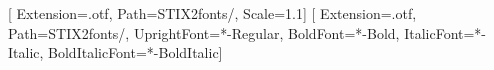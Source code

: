 \usepackage{fontspec}
\usepackage{unicode-math}

[
Extension={.otf},
Path=STIX2fonts/,
Scale=1.1]
\setmainfont{STIX2Text}[
Extension={.otf},
Path=STIX2fonts/,
UprightFont={*-Regular},
BoldFont={*-Bold},
ItalicFont={*-Italic},
BoldItalicFont={*-BoldItalic}]
